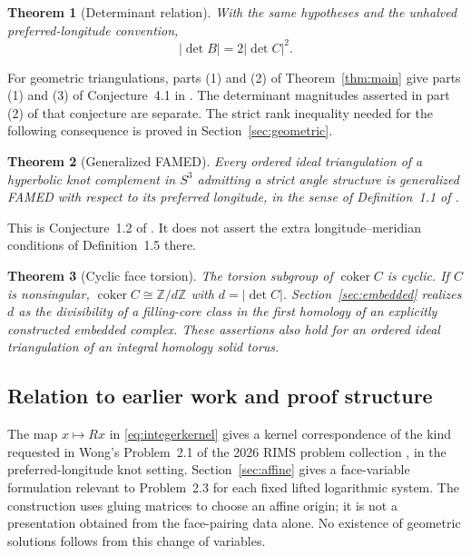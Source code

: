 \documentclass[11pt]{article}
\newtheorem{theorem}{Theorem}[section]
\theoremstyle{definition}\newtheorem{definition}[theorem]{Definition}
\theoremstyle{remark}\newtheorem{remark}[theorem]{Remark}
\DeclareMathOperator{\coker}{coker}
\newcommand{\Z}{\mathbb Z}
\begin{document}
\begin{theorem}[Determinant relation]\label{thm:det}
With the same hypotheses and the unhalved preferred-longitude convention,
\begin{equation}|\det B|=2|\det C|^2.\label{eq:det}
\end{equation}
\end{theorem}

For geometric triangulations, parts (1) and (2) of Theorem~\ref{thm:main} give parts (1) and (3) of Conjecture~4.1 in \cite{BGW}. The determinant magnitudes asserted in part (2) of that conjecture are separate. The strict rank inequality needed for the following consequence is proved in Section~\ref{sec:geometric}.

\begin{theorem}[Generalized FAMED]\label{thm:generalized}
Every ordered ideal triangulation of a hyperbolic knot complement in $S^3$ admitting a strict angle structure is generalized FAMED with respect to its preferred longitude, in the sense of Definition~1.1 of \cite{Wong}.
\end{theorem}
This is Conjecture~1.2 of \cite{Wong}. It does not assert the extra longitude--meridian conditions of Definition~1.5 there.

\begin{theorem}[Cyclic face torsion]\label{thm:cyclic}
The torsion subgroup of $\coker C$ is cyclic. If $C$ is nonsingular, $\coker C\cong\Z/d\Z$ with $d=|\det C|$. Section~\ref{sec:embedded} realizes $d$ as the divisibility of a filling-core class in the first homology of an explicitly constructed embedded complex. These assertions also hold for an ordered ideal triangulation of an integral homology solid torus.
\end{theorem}

\subsection{Relation to earlier work and proof structure}
The map $x\mapsto Rx$ in \eqref{eq:integerkernel} gives a kernel correspondence of the kind requested in Wong's Problem~2.1 of the 2026 RIMS problem collection \cite{RIMS}, in the preferred-longitude knot setting. Section~\ref{sec:affine} gives a face-variable formulation relevant to Problem~2.3 for each fixed lifted logarithmic system. The construction uses gluing matrices to choose an affine origin; it is not a presentation obtained from the face-pairing data alone. No existence of geometric solutions follows from this change of variables.
\end{document}
